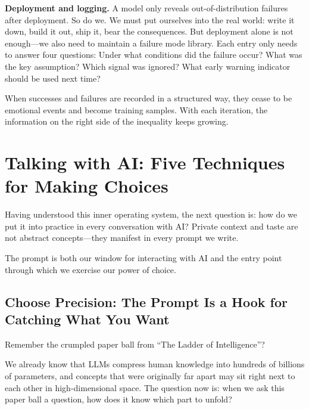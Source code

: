 \vspace{1em}

\textbf{Deployment and logging.} A model only reveals out-of-distribution failures after deployment. So do we. We must put ourselves into the real world: write it down, build it out, ship it, bear the consequences. But deployment alone is not enough---we also need to maintain a failure mode library. Each entry only needs to answer four questions: Under what conditions did the failure occur? What was the key assumption? Which signal was ignored? What early warning indicator should be used next time?

\vspace{0.5em}

When successes and failures are recorded in a structured way, they cease to be emotional events and become training samples. With each iteration, the information on the right side of the inequality keeps growing.

\newpage

\section{Talking with AI: Five Techniques for Making Choices}

Having understood this inner operating system, the next question is: how do we put it into practice in every conversation with AI? Private context and taste are not abstract concepts---they manifest in every prompt we write.

The prompt is both our window for interacting with AI and the entry point through which we exercise our power of choice.

\subsection{Choose Precision: The Prompt Is a Hook for Catching What You Want}

Remember the crumpled paper ball from ``The Ladder of Intelligence''?

We already know that LLMs compress human knowledge into hundreds of billions of parameters, and concepts that were originally far apart may sit right next to each other in high-dimensional space. The question now is: when we ask this paper ball a question, how does it know which part to unfold?


